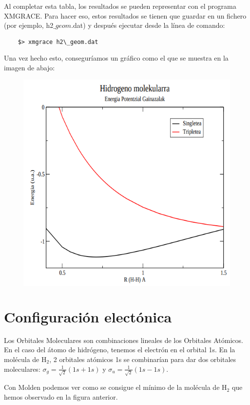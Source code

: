 \documentclass{tufte-book}
\begin{document}
Al completar esta tabla, los resultados se pueden representar con el programa XMGRACE. Para hacer eso, estos resultados se tienen que guardar en un fichero (por ejemplo, h2$\_{geom}$.dat) y después ejecutar desde la línea de comando:
\begin{verbatim}
    $> xmgrace h2\_geom.dat
\end{verbatim}
Una vez hecho esto, conseguríamos un gráfico como el que se muestra en la imagen de abajo:
\begin{figure}[h!]
\centering
\includegraphics[scale=0.5]{PES_H2.png}
\end{figure}

\section{Configuración electónica}
Los Orbitales Moleculares son combinaciones lineales de los Orbitales Atómicos. 
En el caso del átomo de hidrógeno, tenemos el electrón en el orbital 1s. En la
molécula de H$_2$, 2 orbitales atómicos 1s se combinarían para dar dos orbitales
moleculares: $\sigma_g=\frac{1}{\sqrt{2}}(1s+1s)$ y
$\sigma_u=\frac{1}{\sqrt{2}}(1s-1s)$.

Con Molden podemos ver como se consigue el mínimo de la molécula de H$_2$ que 
hemos observado en la figura anterior.
\end{document}

